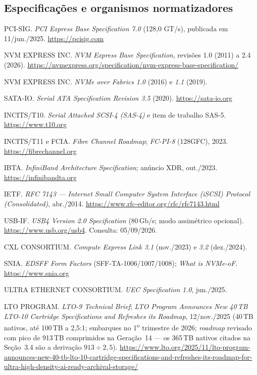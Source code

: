 \documentclass[11pt,a4paper]{article}
\begin{document}
\subsection*{Especificações e organismos normatizadores}
\begin{enumerate}[label={[\arabic*]},leftmargin=*,start=4]
\item PCI-SIG. \emph{PCI Express Base Specification 7.0} (128,0 GT/s), publicada em
      11/jun./2025. \url{https://pcisig.com}
\item NVM EXPRESS INC. \emph{NVM Express Base Specification}, revisões 1.0 (2011) a 2.4
      (2026). \url{https://nvmexpress.org/specification/nvm-express-base-specification/}
\item NVM EXPRESS INC. \emph{NVMe over Fabrics 1.0} (2016) e \emph{1.1} (2019).
\item SATA-IO. \emph{Serial ATA Specification Revision 3.5} (2020).
      \url{https://sata-io.org}
\item INCITS/T10. \emph{Serial Attached SCSI-4 (SAS-4)} e item de trabalho SAS-5.
      \url{https://www.t10.org}
\item INCITS/T11 e FCIA. \emph{Fibre Channel Roadmap}; \emph{FC-PI-8}
      (128GFC), 2023.\\ \url{https://fibrechannel.org}
\item IBTA. \emph{InfiniBand Architecture Specification}; anúncio XDR, out./2023.
      \url{https://infinibandta.org}
\item IETF. \emph{RFC 7143 --- Internet Small Computer System Interface (iSCSI) Protocol
      (Consolidated)}, abr./2014. \url{https://www.rfc-editor.org/rfc/rfc7143.html}
\item USB-IF. \emph{USB4 Version 2.0 Specification} (80\,Gb/s; modo assimétrico opcional).
      \url{https://www.usb.org/usb4}. Consulta: 05/09/2026.
\item CXL CONSORTIUM. \emph{Compute Express Link 3.1} (nov./2023) e \emph{3.2} (dez./2024).
\item SNIA. \emph{EDSFF Form Factors} (SFF-TA-1006/1007/1008); \emph{What is NVMe-oF}.
      \url{https://www.snia.org}
\item ULTRA ETHERNET CONSORTIUM. \emph{UEC Specification 1.0}, jun./2025.
\item LTO PROGRAM. \emph{LTO-9 Technical Brief}; \emph{LTO Program Announces New 40\,TB
      LTO-10 Cartridge Specifications and Refreshes its Roadmap}, 12/nov./2025 (40\,TB nativos,
      até 100\,TB a 2,5:1; embarques no 1\textsuperscript{o} trimestre de 2026; \emph{roadmap}
      revisado com pico de 913\,TB comprimidos na Geração~14 --- os 365\,TB nativos citados na
      Seção~3.4 são a derivação $913 \div 2{,}5$).
      \url{https://www.lto.org/2025/11/lto-program-announces-new-40-tb-lto-10-cartridge-specifications-and-refreshes-its-roadmap-for-ultra-high-density-ai-ready-archival-storage/}
\end{enumerate}
\end{document}
